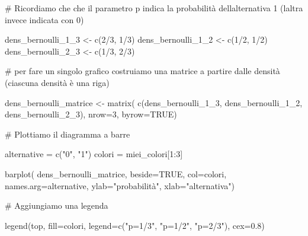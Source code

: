 \documentclass[
  italian,
  letterpaper,
]{book}
\newenvironment{Shaded}{\begin{snugshade}}{\end{snugshade}}
\newcommand{\AttributeTok}[1]{\textcolor[rgb]{0.40,0.45,0.13}{#1}}
\newcommand{\CommentTok}[1]{\textcolor[rgb]{0.37,0.37,0.37}{#1}}
\newcommand{\ConstantTok}[1]{\textcolor[rgb]{0.56,0.35,0.01}{#1}}
\newcommand{\DecValTok}[1]{\textcolor[rgb]{0.68,0.00,0.00}{#1}}
\newcommand{\FloatTok}[1]{\textcolor[rgb]{0.68,0.00,0.00}{#1}}
\newcommand{\FunctionTok}[1]{\textcolor[rgb]{0.28,0.35,0.67}{#1}}
\newcommand{\NormalTok}[1]{\textcolor[rgb]{0.00,0.23,0.31}{#1}}
\newcommand{\OtherTok}[1]{\textcolor[rgb]{0.00,0.23,0.31}{#1}}
\newcommand{\SpecialCharTok}[1]{\textcolor[rgb]{0.37,0.37,0.37}{#1}}
\newcommand{\StringTok}[1]{\textcolor[rgb]{0.13,0.47,0.30}{#1}}
\theoremstyle{definition}
\theoremstyle{remark}
\begin{document}
\begin{Shaded}
\begin{Highlighting}[]
\CommentTok{\# Ricordiamo che che il parametro p indica la probabilità dell\textquotesingle{}alternativa 1 (l\textquotesingle{}altra invece indicata con 0)}

\NormalTok{dens\_bernoulli\_1\_3 }\OtherTok{\textless{}{-}} \FunctionTok{c}\NormalTok{(}\DecValTok{2}\SpecialCharTok{/}\DecValTok{3}\NormalTok{, }\DecValTok{1}\SpecialCharTok{/}\DecValTok{3}\NormalTok{)}
\NormalTok{dens\_bernoulli\_1\_2 }\OtherTok{\textless{}{-}} \FunctionTok{c}\NormalTok{(}\DecValTok{1}\SpecialCharTok{/}\DecValTok{2}\NormalTok{, }\DecValTok{1}\SpecialCharTok{/}\DecValTok{2}\NormalTok{)}
\NormalTok{dens\_bernoulli\_2\_3 }\OtherTok{\textless{}{-}} \FunctionTok{c}\NormalTok{(}\DecValTok{1}\SpecialCharTok{/}\DecValTok{3}\NormalTok{, }\DecValTok{2}\SpecialCharTok{/}\DecValTok{3}\NormalTok{)}

\CommentTok{\# per fare un singolo grafico costruiamo una matrice a partire dalle densità (ciascuna densità è una riga)}

\NormalTok{dens\_bernoulli\_matrice }\OtherTok{\textless{}{-}} \FunctionTok{matrix}\NormalTok{( }\FunctionTok{c}\NormalTok{(dens\_bernoulli\_1\_3, dens\_bernoulli\_1\_2, dens\_bernoulli\_2\_3), }\AttributeTok{nrow=}\DecValTok{3}\NormalTok{, }\AttributeTok{byrow=}\ConstantTok{TRUE}\NormalTok{)}

\CommentTok{\# Plottiamo il diagramma a barre}

\NormalTok{alternative }\OtherTok{=} \FunctionTok{c}\NormalTok{(}\StringTok{"0"}\NormalTok{, }\StringTok{"1"}\NormalTok{)}
\NormalTok{colori }\OtherTok{=}\NormalTok{ miei\_colori[}\DecValTok{1}\SpecialCharTok{:}\DecValTok{3}\NormalTok{]}

\FunctionTok{barplot}\NormalTok{( dens\_bernoulli\_matrice, }\AttributeTok{beside=}\ConstantTok{TRUE}\NormalTok{, }\AttributeTok{col=}\NormalTok{colori, }\AttributeTok{names.arg=}\NormalTok{alternative, }\AttributeTok{ylab=}\StringTok{"probabilità"}\NormalTok{, }\AttributeTok{xlab=}\StringTok{"alternativa"}\NormalTok{)}

\CommentTok{\# Aggiungiamo una legenda}

\FunctionTok{legend}\NormalTok{(}\StringTok{\textquotesingle{}top\textquotesingle{}}\NormalTok{, }\AttributeTok{fill=}\NormalTok{colori, }\AttributeTok{legend=}\FunctionTok{c}\NormalTok{(}\StringTok{"p=1/3"}\NormalTok{, }\StringTok{"p=1/2"}\NormalTok{, }\StringTok{"p=2/3"}\NormalTok{), }\AttributeTok{cex=}\FloatTok{0.8}\NormalTok{)}
\end{Highlighting}
\end{Shaded}
\end{document}

